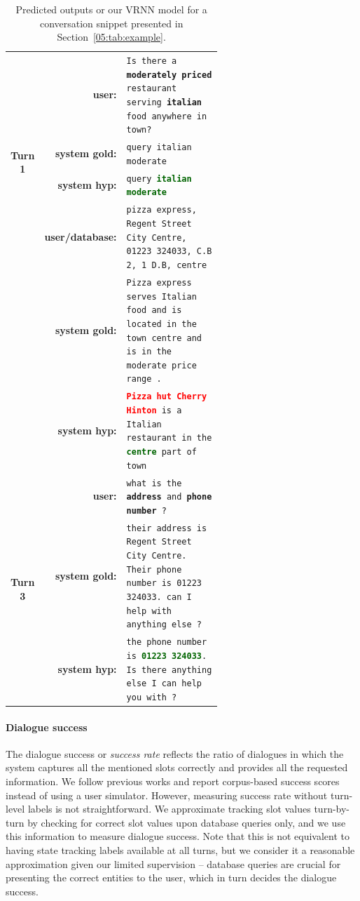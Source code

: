 \begin{table}[tp]
    \centering\scriptsize
    \begin{tabular}{crp{0.6\linewidth}}
        \toprule
         \multirow{4}{*}{\bf Turn 1}&\bf user:& \texttt{Is there a \textbf{moderately priced} restaurant serving \textbf{italian} food anywhere in town?} \\
         &\bf system gold: & \texttt{query italian moderate} \\
         &\bf system hyp: & \texttt{query \textbf{\textcolor{darkgreen}{italian moderate}}}  \\
         \midrule
        \multirow{4}{*}{\bf Turn 2}&\bf user/database:& \texttt{pizza express, Regent Street City Centre, 01223 324033, C.B 2, 1 D.B, centre}  \\
         &\bf system gold:& \texttt{Pizza express serves Italian food and is located in the town centre and is in the moderate price range .} \\        
        &\bf system hyp:& \texttt{\textbf{\textcolor{red}{Pizza hut Cherry Hinton}} is a Italian restaurant in the \textbf{\textcolor{darkgreen}{centre}} part of town} \\
         \midrule
        \multirow{4}{*}{\bf Turn 3}&\bf user:& \texttt{what is the \textbf{address} and \textbf{phone number} ?} \\
        &\bf system gold:& \texttt{their address is  Regent Street City Centre. Their phone number is 01223 324033. can I help with anything else ?} \\
        & \bf system hyp:& \texttt{the phone number is \textbf{\textcolor{darkgreen}{01223 324033}}. Is there anything else I can help you with ?} \\
        \bottomrule
    \end{tabular}
    \vspace{-2mm}
    \caption{Predicted outputs or our VRNN model for a conversation snippet presented in Section~\ref{05:tab:example}.}
    \label{05:tab:example-cont}
\end{table}

\paragraph{Dialogue success}
The dialogue success or \emph{success rate} reflects the ratio of dialogues in which the system captures all the mentioned slots correctly and provides all the requested information.
We follow previous works \cite{nekvinda2021shades} and report corpus-based success scores instead of using a user simulator.
However, measuring success rate without turn-level labels is not straightforward.
We approximate tracking slot values turn-by-turn by checking for correct slot values upon database queries only, and we use this information to measure dialogue success.
Note that this is not equivalent to having state tracking labels available at all turns, but we consider it a reasonable approximation given our limited supervision -- database queries are crucial for presenting the correct entities to the user, which in turn decides the dialogue success.

